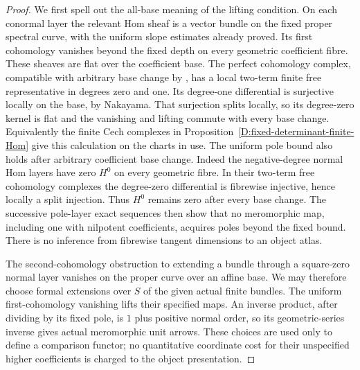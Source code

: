 \begin{proof}
We first spell out the all-base meaning of the lifting
condition. On each conormal layer the relevant Hom sheaf
is a vector bundle on the fixed proper spectral curve,
with the uniform slope estimates already proved. Its first
cohomology vanishes beyond the fixed depth on every
geometric coefficient fibre. These sheaves are flat over
the coefficient base. The perfect cohomology complex, compatible with arbitrary
base change by \citep[Lemma~30.22.1, Tag~07VK]
{StacksUnitJetTransferD}, has a local two-term finite free
representative in degrees zero and one. Its degree-one
differential is surjective locally on the base, by Nakayama. That
surjection splits locally, so its degree-zero kernel is
flat and the vanishing and lifting commute with every
base change. Equivalently the finite Cech complexes in
Proposition~\ref{D:fixed-determinant-finite-Hom} give this
calculation on the charts in use. The uniform pole bound also
holds after arbitrary coefficient base change. Indeed the
negative-degree normal Hom layers have zero $H^0$ on every
geometric fibre. In their two-term free cohomology complexes
the degree-zero differential is fibrewise injective, hence
locally a split injection. Thus $H^0$ remains zero after
every base change. The successive pole-layer exact sequences
then show that no meromorphic map, including one with
nilpotent coefficients, acquires poles beyond the fixed
bound. There is no inference from fibrewise tangent dimensions
to an object atlas.

The second-cohomology obstruction to extending a bundle
through a square-zero normal layer vanishes on the proper
curve over an affine base. We may therefore choose formal
extensions over $S$ of the given actual finite bundles.
The uniform first-cohomology vanishing lifts their specified
maps. An inverse product, after dividing by its fixed pole,
is $1$ plus positive normal order, so its geometric-series
inverse gives actual meromorphic unit arrows. These choices
are used only to define a comparison functor; no quantitative
coordinate cost for their unspecified higher coefficients
is charged to the object presentation.


\end{proof}
